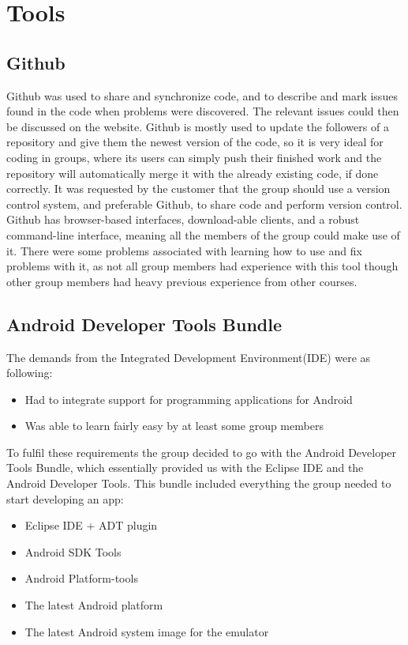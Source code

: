 \chapter{Tools}

\section{Github} 
\label{def:github}
\label{def:githubDev}
Github was used to share and synchronize code, and to describe and mark issues found in the code when problems were discovered. The relevant issues could then be discussed on the website. Github is mostly used to update the followers of a repository and give them the newest version of the code, so it is  very ideal for coding in groups, where its users can simply push their finished work and the repository will automatically merge it with the already existing code, if done correctly. It was requested by the customer that the group should use a version control system, and preferable Github, to share code and perform version control. Github has browser-based interfaces, download-able clients, and a robust command-line interface, meaning all the members of the group could make use of it. There were some problems associated with learning how to use and fix problems with it, as not all group members had experience with this tool though other group members had heavy previous experience from other courses.

\section{Android Developer Tools Bundle}
The demands from the Integrated Development Environment(IDE) were as following:
\begin{itemize}
\item Had to integrate support for programming applications for Android
\item Was able to learn fairly easy by at least some group members
\end{itemize}
To fulfil these requirements the group decided to go with the Android Developer Tools Bundle, which essentially provided us with the Eclipse IDE and the Android Developer Tools. This bundle included everything the group needed to start developing an app:
\begin{itemize}
\item Eclipse IDE + ADT plugin
\item Android SDK Tools
\item Android Platform-tools
\item The latest Android platform
\item The latest Android system image for the emulator
\end{itemize}

